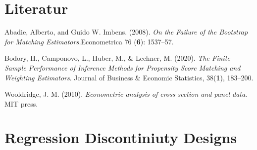 \documentclass[
  a4paper,
  DIV=11,
  oneside]{scrreprt}
\newenvironment{Shaded}{\begin{snugshade}}{\end{snugshade}}
\newcommand{\NormalTok}[1]{\textcolor[rgb]{0.00,0.23,0.31}{#1}}
\begin{document}
\begin{Shaded}
\end{Shaded}

\begin{Shaded}
\end{Shaded}

\vfill


\hypertarget{literatur}{%
\chapter{Literatur}\label{literatur}}

Abadie, Alberto, and Guido W. Imbens. (2008). \emph{On the Failure of
the Bootstrap for Matching Estimators.}Econometrica 76 (\textbf{6}):
1537--57.

Bodory, H., Camponovo, L., Huber, M., \& Lechner, M. (2020). \emph{The
Finite Sample Performance of Inference Methods for Propensity Score
Matching and Weighting Estimators}. Journal of Business \& Economic
Statistics, 38(\textbf{1}), 183--200.

Wooldridge, J. M. (2010). \emph{Econometric analysis of cross section
and panel data}. MIT press.


\hypertarget{regression-discontiniuty-designs}{%
\chapter{Regression Discontiniuty
Designs}\label{regression-discontiniuty-designs}}
\end{document}

